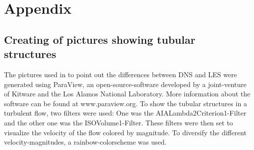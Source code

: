 \documentclass[11pt,a4paper,openany,oneside,parskip=half*]{article}
\begin{document}
\section{Appendix}
\subsection*{Creating of pictures showing tubular structures}
The pictures used in to point out the differences between DNS and LES were generated using ParaView, an open-source-software developed by a joint-venture of Kitware and the Los Alamos National Laboratory. More information about the software can be found at www.paraview.org. To show the tubular structures in a turbulent flow, two filters were used: One was the AIALambda2Criterion1-Filter and the other one was the ISOVolume1-Filter. These filters were then set to visualize the velocity of the flow colored by magnitude. To diversify the different velocity-magnitudes, a rainbow-colorscheme was used. 
\end{document}
